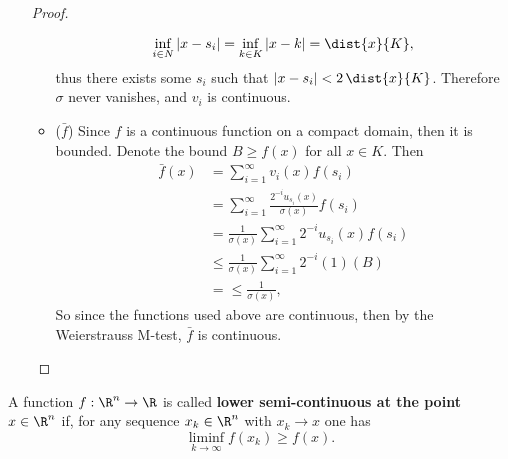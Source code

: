 \documentclass[12pt,letterpaper]{article}
\begin{document}
\begin{enumerate}
\begin{proof}
\begin{itemize}
$$\inf_{i\in N}|x-s_i|=\inf_{k\in K}|x-k|=\dist{x}{K},$$ 
thus there exists some $s_i$ such that $|x-s_i|<2\,\dist{x}{K}$. Therefore $\sigma$ never vanishes, and $v_i$ is continuous. 
\item ($\bar{f}$) Since $f$ is a continuous function on a compact domain, then it is bounded. Denote the bound $B\geq f(x)$ for all $x\in K$. Then 
\begin{align*}
\bar{f}(x)&=\sum_{i=1}^\infty v_i(x)f(s_i)\\
&=\sum_{i=1}^\infty \frac{2^{-i}u_{s_i}(x)}{\sigma(x)}f(s_i)\\
&=\frac{1}{\sigma(x)}\sum_{i=1}^\infty 2^{-i}u_{s_i}(x)f(s_i)\\
&\leq\frac{1}{\sigma(x)}\sum_{i=1}^\infty 2^{-i}(1)(B)\\
&=\leq\frac{1}{\sigma(x)},
\end{align*}
So since the functions used above are continuous, then by the Weierstrauss M-test, $\bar{f}$ is continuous. \qedhere
\end{itemize}
\end{proof}
\end{enumerate}

\pagebreak
\begin{definition*}
A function $f:\R^n\to\R$ is called \textbf{lower semi-continuous at the point} $x\in\R^n$ if, for any sequence $x_k\in\R^n$ with $x_k\to x$ one has 
$$\liminf_{k\to\infty	}f(x_k)\geq f(x).$$
\end{definition*}
\end{document}
